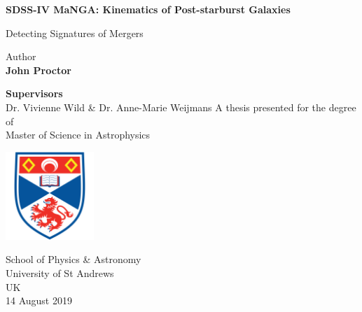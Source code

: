 
\begin{titlepage}
   \begin{center}
       \vspace*{1cm}
        
       \Huge
       \textbf{SDSS-IV MaNGA: Kinematics of Post-starburst Galaxies}
 
       \vspace{0.5cm}
       \huge
       Detecting Signatures of Mergers 
       \vspace{1.5cm}
 
       Author\\
       \textbf{John Proctor}
       \vfill
       
       \textbf{Supervisors}\\
       Dr. Vivienne Wild \& Dr. Anne-Marie Weijmans
       \vfill
       A thesis presented for the degree of\\
       Master of Science in Astrophysics
 
       \vspace{2.5cm}
 
       \includegraphics[width=0.25\textwidth]{images/University-of-st-andrews-shield.png}
 
       \vspace{2.5cm}
       
       \Large
       School of Physics \& Astronomy\\
       University of St Andrews\\
       UK\\
       14 August 2019
   \end{center}
   
   
\end{titlepage}





